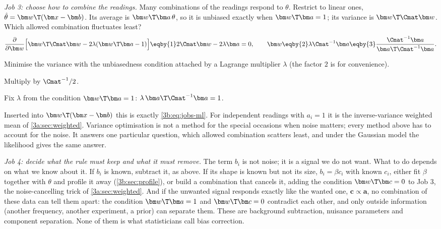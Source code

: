 \emph{Job 3: choose how to combine the readings.} Many combinations of the readings respond to $\theta$. Restrict to linear ones, $\hat\theta=\bm w\T(\bm x-\bm b)$. Its average is $\bm w\T\bm a\,\theta$, so it is unbiased exactly when $\bm w\T\bm a=1$; its variance is $\bm w\T\Cmat\bm w$. Which allowed combination fluctuates least?
\begin{equation}
\frac{\partial}{\partial\bm w}\Bigl[\bm w\T\Cmat\bm w-2\lambda(\bm w\T\bm a-1)\Bigr]\eqby{1}2\Cmat\bm w-2\lambda\bm a=0,\qquad
\bm w\eqby{2}\lambda\Cmat^{-1}\bm a\eqby{3}\frac{\Cmat^{-1}\bm a}{\bm a\T\Cmat^{-1}\bm a}.
\label{3b:eq:jobs-blue}
\end{equation}
\begin{explain}
  \item Minimise the variance with the unbiasedness condition attached by a Lagrange multiplier $\lambda$ (the factor $2$ is for convenience).
  \item Multiply by $\Cmat^{-1}/2$.
  \item Fix $\lambda$ from the condition $\bm w\T\bm a=1$: $\lambda\,\bm a\T\Cmat^{-1}\bm a=1$.
\end{explain}
Inserted into $\bm w\T(\bm x-\bm b)$ this is exactly \eqref{3b:eq:jobs-ml}. For independent readings with $a_i=1$ it is the inverse-variance weighted mean of \cref{3a:sec:weighted}. Variance optimisation is not a method for the special occasions when noise matters; every method above has to account for the noise. It answers one particular question, which allowed combination scatters least, and under the Gaussian model the likelihood gives the same answer.

\emph{Job 4: decide what the rule must keep and what it must remove.} The term $b_i$ is not noise; it is a signal we do not want. What to do depends on what we know about it. If $b_i$ is known, subtract it, as above. If its shape is known but not its size, $b_i=\beta c_i$ with known $c_i$, either fit $\beta$ together with $\theta$ and profile it away (\cref{3b:sec:profile}), or build a combination that cancels it, adding the condition $\bm w\T\bm c=0$ to Job 3, the noise-cancelling trick of \cref{3a:sec:weighted}. And if the unwanted signal responds exactly like the wanted one, $\bm c\propto\bm a$, no combination of these data can tell them apart: the condition $\bm w\T\bm a=1$ and $\bm w\T\bm c=0$ contradict each other, and only outside information (another frequency, another experiment, a prior) can separate them. These are background subtraction, nuisance parameters and component separation. None of them is what statisticians call bias correction.

